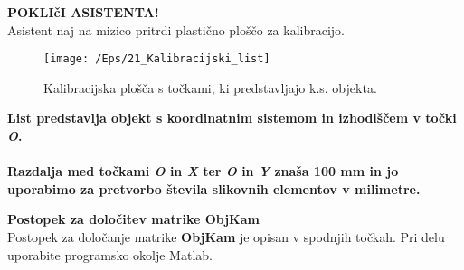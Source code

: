 \vspace{0.1cm}
\begin{mdframed}[backgroundcolor=red!80, shadow=true,roundcorner=8pt]
        \vspace{0.1cm}
        \center
        \large
\textcolor[rgb]{1.00,1.00,0.00}{\LARGE\textbf{POKLIčI ASISTENTA!}}\\ %
\textcolor[rgb]{1.00,1.00,0.00}{\large Asistent naj na mizico pritrdi plastično ploščo za kalibracijo.} \\ %
\end{mdframed}
\vspace{0.1cm}

\begin{figure}[h]
    \center
    \texttt{[image: /Eps/21\_Kalibracijski\_list]}
    \vspace{-0.3cm}
    \caption{Kalibracijska plošča s točkami, ki predstavljajo k.s. objekta.}
    \label{fKalibracijskiList}
\end{figure}


\noindent %
\begin{mdframed}[backgroundcolor=blue!20, shadow=true,roundcorner=8pt]
        \vspace{0.2cm}
        \textbf{List predstavlja objekt s koordinatnim sistemom in izhodiščem  v točki
        \emph{O}.}\\\\
        \textbf{Razdalja med točkami \emph{O} in \emph{X} ter \emph{O} in
        \emph{Y} znaša 100 mm in jo uporabimo za pretvorbo števila slikovnih elementov v milimetre.}
        \vspace{0.2cm}

\end{mdframed}
\normalsize

\noindent %
\textbf{Postopek za določitev matrike ObjKam} %
\\
Postopek za določanje matrike \textbf{ObjKam} je opisan v spodnjih
točkah. Pri delu uporabite programsko okolje Matlab.

